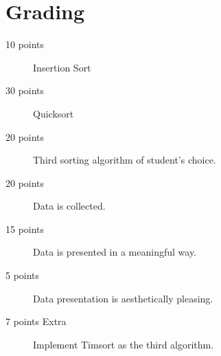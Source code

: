 \documentclass[10pt,letterpaper]{article}
\begin{document}
	\section{Grading}
 	
 	\begin{description}
 		\item[10 points] Insertion Sort
 		\item[30 points] Quicksort
 		\item[20 points] Third sorting algorithm of student's choice.
 		\item[20 points] Data is collected.
 		\item[15 points] Data is presented in a meaningful way.
 		\item[5 points]  Data presentation is aesthetically pleasing.
 		\item[7 points Extra]  Implement Timsort as the third algorithm.
 	\end{description}
 	
 	
\end{document}
